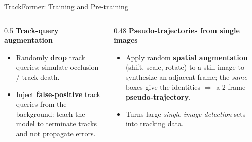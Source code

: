 \begin{frame}[fragile]{TrackFormer: Training and Pre-training}
\begin{columns}[T]
\begin{column}{0.5\textwidth}
      \vspace{0.3em}
      \textbf{Track-query augmentation}
      \begin{itemize}
        \item Randomly \textbf{drop} track queries: simulate occlusion / track death.
        \item Inject \textbf{false-positive} track queries from the background: teach the model to terminate tracks and not propagate errors.
      \end{itemize}
    \end{column}
    \begin{column}{0.48\textwidth}
      \textbf{Pseudo-trajectories from single images}
      \begin{center}
      \end{center}
      \begin{itemize}
        \item Apply random \textbf{spatial augmentation} (shift, scale, rotate) to a still image to synthesize an adjacent frame; the \emph{same} boxes give the identities $\Rightarrow$ a 2-frame \textbf{pseudo-trajectory}.
        \item Turns large \emph{single-image detection} sets into tracking data.
      \end{itemize}


\end{column}
\end{columns}
\end{frame}
